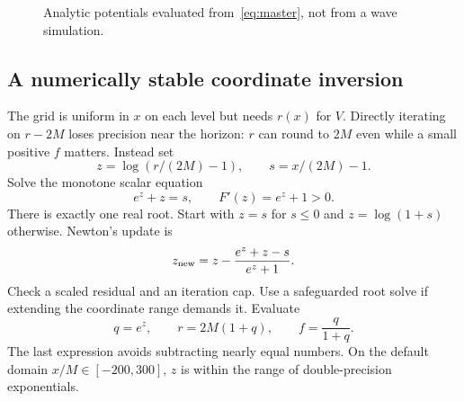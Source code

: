 \documentclass[11pt,a4paper]{article}
\numberwithin{equation}{section}
\begin{document}
\begin{figure}[htbp]
\centering
{}
\caption{Analytic potentials evaluated from~\eqref{eq:master}, not from a
wave simulation.}
\end{figure}

\subsection{A numerically stable coordinate inversion}
The grid is uniform in $x$ on each level but needs $r(x)$ for $V$.
Directly iterating on $r-2M$ loses precision near the horizon: $r$ can round
to $2M$ even while a small positive $f$ matters. Instead set
\begin{equation}
 z=\log(r/(2M)-1),\qquad s=x/(2M)-1.
\end{equation}
Solve the monotone scalar equation
\begin{equation}\label{eq:loginverse}
 e^z+z=s,\qquad F'(z)=e^z+1>0.
\end{equation}
There is exactly one real root. Start with $z=s$ for $s\leq0$ and
$z=\log(1+s)$ otherwise. Newton's update is
\begin{equation}
 z_{\rm new}=z-\frac{e^z+z-s}{e^z+1}.
\end{equation}
Check a scaled residual and an iteration cap. Use a safeguarded root solve
if extending the coordinate range demands it. Evaluate
\begin{equation}
 q=e^z,\qquad r=2M(1+q),\qquad f=\frac{q}{1+q}.
\end{equation}
The last expression avoids subtracting nearly equal numbers. On the default
domain $x/M\in[-200,300]$, $z$ is within the range of double-precision
exponentials.
\end{document}
